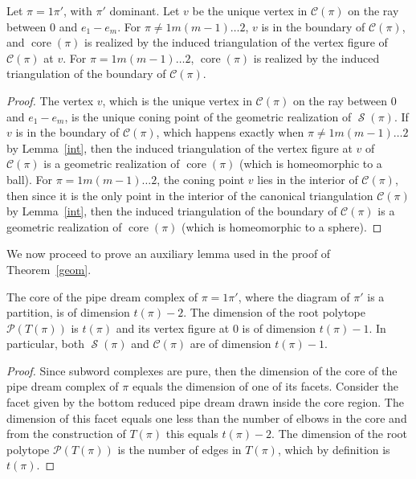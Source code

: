 \documentclass[ALCO,ThmDefs]{cedram}
\numberwithin{equation}{section}
\DeclareMathOperator{\core}{core}
\newcommand*\C{{\mathcal{C}}}
\renewcommand*\P{{\mathcal{P}}}
\newcommand*\+{\smash{\lower2pt\hbox{\rlap{\vrule height14pt}}\raise2pt\hbox{\rlap{\hskip-3pt \vrule height.4pt depth0pt width14.7pt}}}}
\DeclareMathOperator{\Scal}{\mathcal{S}}
\begin{document}
\begin{theo}\label{thm:core}
Let $\pi=1\pi'$, with $\pi'$ dominant. Let $v$ be the unique vertex in $\C(\pi)$ on the ray between $0$ and $e_1-e_m$. For $\pi \neq 1 m (m-1)\dots 2$, $v$ is in the boundary of $\C(\pi)$, and $\core(\pi)$
is realized by the induced triangulation of the vertex figure of $\C(\pi)$ at $v$. For $\pi=1 m (m-1)\dots 2$, $\core(\pi)$ is realized by the induced triangulation of the boundary of $\C(\pi)$.
\end{theo}

\begin{proof} The vertex $v$, which is the unique vertex in $\C(\pi)$ on the ray between $0$ and $e_1-e_m$, is the unique coning point of the geometric realization of $\Scal(\pi)$. If $v$ is in the boundary of $\C(\pi)$, which happens exactly when $\pi \neq 1 m (m-1)\dots 2$ by Lemma~\ref{int}, then the induced triangulation of the vertex figure at $v$ of $\C(\pi)$ is a geometric realization of $\core(\pi)$ (which is homeomorphic to a ball). For $\pi=1 m (m-1)\dots 2$, the coning point $v$ lies in the interior of $\C(\pi)$, then since it is the only point in the interior of the canonical triangulation $\C(\pi)$ by Lemma~\ref{int}, then the induced triangulation of the boundary of $\C(\pi)$ is a geometric realization of $\core(\pi)$ (which is homeomorphic to a sphere).
\end{proof}

We now proceed to prove an auxiliary lemma used in the proof of Theorem~\ref{geom}.

\begin{lemm}\label{dim}
The core of the pipe dream complex of $\pi=1\pi'$, where the diagram of $\pi'$ is a partition, is of dimension $t(\pi)-2$. The dimension of the root polytope $\P(T(\pi))$ is $t(\pi)$ and its vertex figure at $0$ is of dimension $t(\pi)-1$. In particular, both $\Scal(\pi)$ and $\C(\pi)$ are of dimension $t(\pi)-1$. 
\end{lemm}

\begin{proof} Since subword complexes are pure, then the dimension of the core of the pipe dream complex of $\pi$ equals the dimension of one of its facets. Consider the facet given by the bottom reduced pipe dream drawn inside the core region. The dimension of this facet equals one less than the number of elbows in the core and from the construction of $T(\pi)$ this equals $t(\pi)-2$. The dimension of the root polytope $\P(T(\pi))$ is the number of edges in $T(\pi)$, which by definition is $t(\pi)$.
\end{proof}
\end{document}
